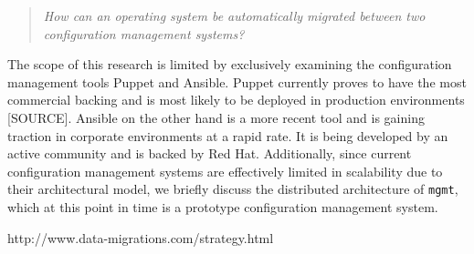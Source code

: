 \begin{quote}
\textit{How can an operating system be automatically migrated between two configuration management systems?}
\end{quote}

\noindent
The scope of this research is limited by exclusively examining the configuration management tools Puppet and Ansible. Puppet currently proves to have the most commercial backing and is most likely to be deployed in production environments [SOURCE]. Ansible on the other hand is a more recent tool and is gaining traction in corporate environments at a rapid rate. It is being developed by an active community and is backed by Red Hat. Additionally, since current configuration management systems are effectively limited in scalability due to their architectural model, we briefly discuss the distributed architecture of \texttt{mgmt}, which at this point in time is a prototype configuration management system.

http://www.data-migrations.com/strategy.html

